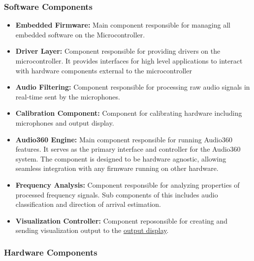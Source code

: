 \documentclass[12pt]{article}
\theoremstyle{definition}
\begin{document}
\subsubsection{Software Components}

\begin{itemize}
  \item \textbf{Embedded Firmware:} \label{comp:embedded_firmware}
  Main component responsible for managing all embedded software on the
  Microcontroller.

  \item \textbf{Driver Layer:} \label{comp:driver_layer}
  Component responsible for providing drivers on the microcontroller. It
  provides interfaces for high level applications to interact with
  hardware components external to the microcontroller

  \item \textbf{Audio Filtering:} \label{comp:audio_filtering}
  Component responsible for processing raw audio signals in real-time sent
  by the microphones.

  \item \textbf{Calibration Component:} \label{comp:calibration}
  Component for calibrating hardware including microphones and output display.
  
  \item \textbf{Audio360 Engine:} \label{comp:audio360Engine}
  Main component responsible for running Audio360 features. It serves as the
  primary interface and controller for the Audio360 system. The component is
  designed to be hardware agnostic, allowing seamless integration with any
  firmware running on other hardware.
  
  \item \textbf{Frequency Analysis:} \label{comp:frequency_analysis}
  Component responsible for analyzing properties of processed frequency signals.
  Sub components of this includes audio classification and direction of arrival
  estimation.
  
  \item \textbf{Visualization Controller:} \label{comp:viz_controller}
  Component reposonsible for creating and sending visualization output to the
  \hyperref[comp:display]{output display}.
\end{itemize}

\subsubsection{Hardware Components}
\end{document}
